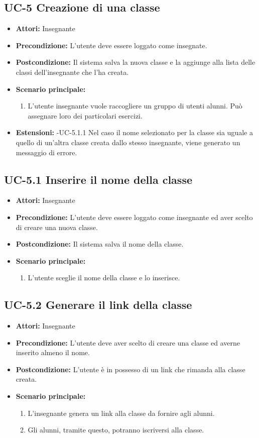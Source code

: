 \subsection{UC-5 Creazione di una classe}
\begin{itemize}
	\item \textbf{Attori:} Insegnante
	\item \textbf{Precondizione:} L'utente deve essere loggato come insegnate.
	\item \textbf{Postcondizione:} Il sistema salva la nuova classe e la aggiunge alla lista delle classi dell'insegnante che l'ha creata.
	\item \textbf{Scenario principale:} 
	\begin{enumerate}
			\item L'utente insegnante vuole raccogliere un gruppo di utenti alunni. Può assegnare loro dei particolari esercizi.
		\end{enumerate}
	\item \textbf{Estensioni:}
	-UC-5.1.1 Nel caso il nome selezionato per la classe sia uguale a quello di un'altra classe creata dallo stesso insegnante, viene generato un messaggio di errore.
\end{itemize}
\subsection{UC-5.1 Inserire il nome della classe}
\begin{itemize}
	\item \textbf{Attori:} Insegnante
	\item \textbf{Precondizione:} L'utente deve essere loggato come insegnante ed aver scelto di creare una nuova classe.
	\item \textbf{Postcondizione:} Il sistema salva il nome della classe.
	\item \textbf{Scenario principale:} 
	\begin{enumerate}
			\item L'utente sceglie il nome della classe e lo inserisce.
		\end{enumerate}
\end{itemize}
\subsection{UC-5.2 Generare il link della classe}
\begin{itemize}
	\item \textbf{Attori:} Insegnante
	\item \textbf{Precondizione:} L'utente deve aver scelto di creare una classe ed averne inserito almeno il nome.
	\item \textbf{Postcondizione:} L'utente è in possesso di un link che rimanda alla classe creata.
	\item \textbf{Scenario principale:} 
	\begin{enumerate}
			\item L'insegnante genera un link alla classe da fornire agli alunni.
			\item Gli alunni, tramite questo, potranno iscriversi alla classe.
		\end{enumerate}
\end{itemize}
